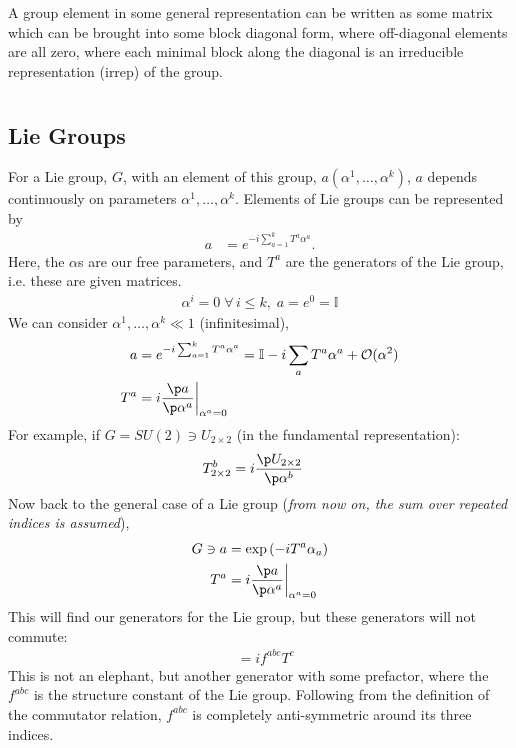 \documentclass[relqm.tex]{subfiles}
\begin{document}
A group element in some general representation can be written as some matrix which can be brought into some block diagonal form, where off-diagonal elements are all zero, where each minimal block along the diagonal is an irreducible representation (irrep) of the group.

\chapter{}
\section{Lie Groups}
For a Lie group, $G$, with an element of this group, $a(\alpha^1,\dots,\alpha^k)$, $a$ depends continuously on parameters $\alpha^1,\dots,\alpha^k$. 
Elements of Lie groups can be represented by
\begin{align}
    a &= e^{-i\sum_{a=1}^k T^a\alpha^a}.
\end{align}
Here, the $\alpha$s are our free parameters, and $T^a$ are the generators of the Lie group, i.e. these are given matrices.
\begin{align}
    \alpha^i=0\; \forall\, i \leq k,\; a = e^0 = \mathbb{I}
\end{align}
We can consider $\alpha^1,\dots,\alpha^k\ll1$ (infinitesimal),
\begin{align}
    a &= e^{-i\sum_{a=1}^k T^a\alpha^a} = \mathbb{I} - i\sum_a T^a\alpha^a + \mathcal{O}(\alpha^2) \\
    T^a &= i\frac{\p a}{\p\alpha^a}\bigg|_{\alpha^a=0}
\end{align}
For example, if $G=SU(2)\ni U_{2\times2}$ (in the fundamental representation):
\begin{align}
    T^b_{2\times2} &= i\frac{\p U_{2\times2}}{\p\alpha^b}
\end{align}
Now back to the general case of a Lie group (\textit{from now on, the sum over repeated indices is assumed}),
\begin{align}
    G \ni a &= \exp\left(-iT^a\alpha_a\right) \\
    T^a &= i\frac{\p a}{\p\alpha^a}\bigg|_{\alpha^a=0}
\end{align}
This will find our generators for the Lie group, but these generators will not commute:
\begin{align}
    [T^a,T^b] &= if^{abc}T^c
\end{align}
This is not an elephant, but another generator with some prefactor, where the $f^{abc}$ is the structure constant of the Lie group. 
Following from the definition of the commutator relation, $f^{abc}$ is completely anti-symmetric around its three indices.
\end{document}
